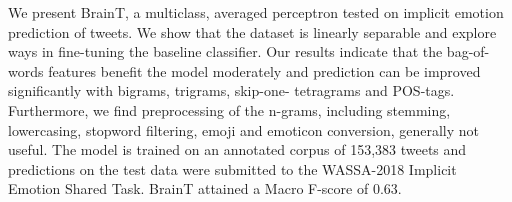 We present BrainT, a multiclass, averaged perceptron tested on implicit emotion prediction of tweets. We show that the dataset is linearly separable and explore ways in fine-tuning the baseline classifier. Our results indicate that the bag-of-words features benefit the model moderately and prediction can be improved significantly with bigrams, trigrams, skip-one- tetragrams and POS-tags.  Furthermore, we find preprocessing of the n-grams, including stemming, lowercasing, stopword filtering, emoji and emoticon conversion, generally not useful. The model is trained on an annotated corpus of 153,383 tweets and predictions on the test data were submitted to the  WASSA-2018 Implicit Emotion Shared Task. BrainT attained a Macro F-score of 0.63.
